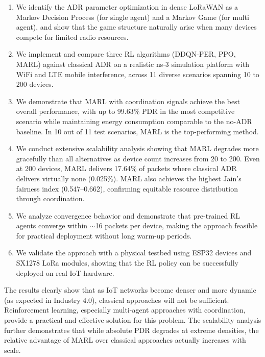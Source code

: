 \documentclass[12pt,a4paper]{article}
\begin{document}
\begin{enumerate}
    \item We identify the ADR parameter optimization in dense LoRaWAN as a Markov Decision Process (for single agent) and a Markov Game (for multi agent), and show that the game structure naturally arise when many devices compete for limited radio resources.
    
    \item We implement and compare three RL algorithms (DDQN-PER, PPO, MARL) against classical ADR on a realistic ns-3 simulation platform with WiFi and LTE mobile interference, across 11 diverse scenarios spanning 10 to 200 devices.
    
    \item We demonstrate that MARL with coordination signals achieve the best overall performance, with up to 99.63\% PDR in the most competitive scenario while maintaining energy consumption comparable to the no-ADR baseline. In 10 out of 11 test scenarios, MARL is the top-performing method.
    
    \item We conduct extensive scalability analysis showing that MARL degrades more gracefully than all alternatives as device count increases from 20 to 200. Even at 200 devices, MARL delivers 17.64\% of packets where classical ADR delivers virtually none (0.025\%). MARL also achieves the highest Jain's fairness index (0.547--0.662), confirming equitable resource distribution through coordination.
    
    \item We analyze convergence behavior and demonstrate that pre-trained RL agents converge within $\sim$16 packets per device, making the approach feasible for practical deployment without long warm-up periods.
    
    \item We validate the approach with a physical testbed using ESP32 devices and SX1278 LoRa modules, showing that the RL policy can be successfully deployed on real IoT hardware.
\end{enumerate}

The results clearly show that as IoT networks become denser and more dynamic (as expected in Industry 4.0), classical approaches will not be sufficient. Reinforcement learning, especially multi-agent approaches with coordination, provide a practical and effective solution for this problem. The scalability analysis further demonstrates that while absolute PDR degrades at extreme densities, the relative advantage of MARL over classical approaches actually increases with scale.

\end{document}
